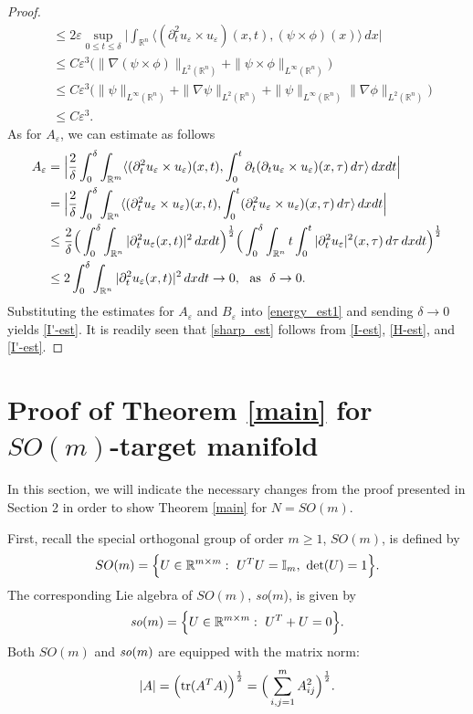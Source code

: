 \documentclass[12pt,twoside,reqno]{amsart}
\theoremstyle{definition}              %
\theoremstyle{remark}                  %
\newcommand{\R}{\mathbb{R}}                 %
\newcommand{\eps}{\varepsilon}
\renewcommand{\1}{\mathbbm{1}}                                      %
\numberwithin{equation}{section}
\numberwithin{definition}{section}
\numberwithin{theorem}{section}
\numberwithin{remark}{section}
\begin{document}
\begin{proof}
\begin{align*}
 &\le  
2\eps\sup_{0\le t\le\delta}
\Big|\int_{\mathbb{R}^n}\langle (\partial_t^2u_\eps\times u_\eps)(x,t), (\psi\times \phi)(x)\rangle\,dx\Big|\\
&\le C\eps^3\big(\|\nabla(\psi\times\phi)\|_{L^2(\mathbb{R}^n)}
+\|\psi\times\phi\|_{L^\infty(\mathbb{R}^n)}\big)\\
&\le C\eps^3
\Big(\|\psi\|_{L^\infty(\mathbb{R}^n)}
+\|\nabla\psi\|_{L^2(\mathbb{R}^n)}
+\|\psi\|_{L^\infty(\mathbb{R}^n)}
\|\nabla\phi\|_{L^2(\mathbb{R}^n)}\Big)\\
&\le C\eps^3.
\end{align*}
As for $A_\eps$, we can estimate as follows
\begin{align*}
A_\eps   
&=\Big|\frac{2}{\delta}\int_0^\delta
\int_{\mathbb{R}^m}\langle (\partial_t^2u_\eps\times 
u_\eps)(x,t), \int_0^t \partial_t(\partial_tu_\eps\times u_\eps)(x, \tau)\,d\tau\rangle\,dxdt\Big|\\
&=
\Big|\frac{2}{\delta}\int_0^\delta
\int_{\mathbb{R}^n}\langle (\partial_t^2u_\eps\times 
u_\eps)(x,t), \int_0^t (\partial_t^2u_\eps\times u_\eps)(x, \tau)\,d\tau\rangle\,dxdt\Big|\\
&\le \frac{2}{\delta}
\Big(\int_0^\delta
\int_{\mathbb{R}^n}|\partial_t^2u_\eps(x,t)|^2\,dxdt\Big)^\frac12
\Big(\int_0^\delta
\int_{\mathbb{R}^n}t\int_0^t|\partial_t^2u_\eps|^2(x,\tau)\,d\tau\,dxdt\Big)^\frac12\\
&\le 2\int_0^\delta
\int_{\mathbb{R}^n}|\partial_t^2u_\eps(x,t)|^2\,dxdt
\to 0,\ \ {\rm{as}}\ \ \delta\to 0.
\end{align*}
Substituting the estimates for $A_\eps$
and $B_\eps$ into \eqref{energy_est1} and sending $\delta\to 0$ yields
\eqref{I'-est}.
It is readily seen that \eqref{sharp_est}
follows from \eqref{I-est}, \eqref{H-est},
and \eqref{I'-est}.
\end{proof}


\section{Proof of Theorem \ref{main} for $SO(m)$-target manifold}

In this section, we will indicate the necessary changes from the proof presented in Section 2 in order to show Theorem \ref{main} for $N=SO(m)$.

First, recall the special orthogonal group of order $m\ge 1$, $SO(m)$, is defined by
\[
SO(m)=\Big\{U\in \R^{m\times m}: \ U^TU=\mathbb{I}_m, 
\ {\rm{det}}(U)=1\Big\}. 
\]
The corresponding Lie algebra of $SO(m)$, {\it so}($m$), is given by 
\[
{\it so}(m)=\Big\{U\in \R^{m\times m}: \ U^T+U=0\Big\}.
\]
Both $SO(m)$ and ${\it so}(m)$ are equipped with the matrix norm:
\[
|A|=\Big({\rm{tr}}(A^TA)\Big)^\frac12=\Big(\sum_{i, j=1}^{m}A_{ij}^2\Big)^\frac12.
\]
\end{document}
